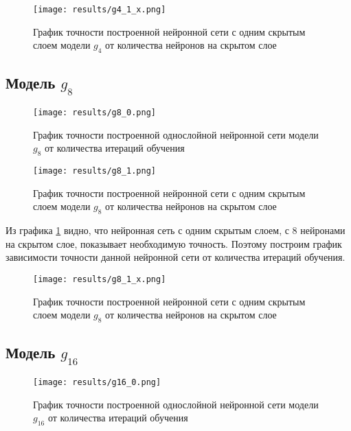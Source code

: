 \begin{figure}[H]
	\texttt{[image: results/g4\_1\_x.png]}
	
	\caption{График точности построенной нейронной сети с одним скрытым слоем модели $g_4$ от количества нейронов на скрытом слое}
\end{figure}

\subsection{Модель $g_8$}
\begin{figure}[H]
	\texttt{[image: results/g8\_0.png]}
	
	\caption{График точности построенной однослойной нейронной сети модели $g_8$ от количества итераций обучения}
	
\end{figure}


\begin{figure}[H]
	\texttt{[image: results/g8\_1.png]}
	
	\caption{График точности построенной нейронной сети с одним скрытым слоем модели $g_8$ от количества нейронов на скрытом слое}
	\label{graphic8}
\end{figure}

Из графика \ref{graphic8} видно, что нейронная сеть с одним скрытым слоем, с 8 нейронами на скрытом слое, показывает необходимую точность. Поэтому построим график зависимости точности данной нейронной сети от количества итераций обучения.

\begin{figure}[H]
	\texttt{[image: results/g8\_1\_x.png]}
	
	\caption{График точности построенной нейронной сети с одним скрытым слоем модели $g_8$ от количества нейронов на скрытом слое}
\end{figure}

\subsection{Модель $g_{16}$}
\begin{figure}[H]
	\texttt{[image: results/g16\_0.png]}
	
	\caption{График точности построенной однослойной нейронной сети модели $g_{16}$ от количества итераций обучения}
	
\end{figure}


